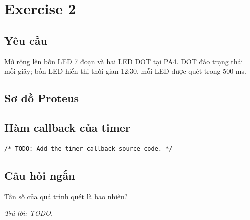 \section{Exercise 2}

\subsection{Yêu cầu}
Mở rộng lên bốn LED 7 đoạn và hai LED DOT tại PA4. DOT đảo trạng thái mỗi giây;
bốn LED hiển thị thời gian 12:30, mỗi LED được quét trong 500 ms.

\subsection{Sơ đồ Proteus}

\subsection{Hàm callback của timer}
\begin{lstlisting}[caption={Timer callback -- Exercise 2}]
/* TODO: Add the timer callback source code. */
\end{lstlisting}

\subsection{Câu hỏi ngắn}
Tần số của quá trình quét là bao nhiêu?

\textit{Trả lời: TODO.}
